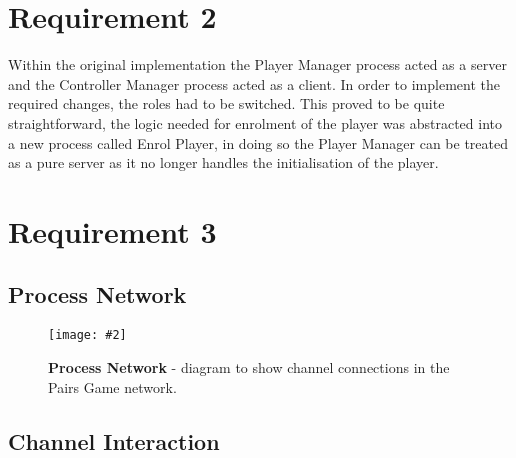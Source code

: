 \documentclass[10pt, a4paper]{article}
\title{\mytitle}
\author{\myauthor\hspace{1em}\\\contact\\Edinburgh Napier University\hspace{0.5em}-\hspace{0.5em}\mymodule}
\date{}
\newcommand{\figuremacro}[5]{
    \begin{figure}[#1]
        \centering
        \texttt{[image: \#2]}
        \caption[#3]{\textbf{#3}#4}
        \label{fig:#2}
    \end{figure}
}
\begin{document}
	\maketitle	
	
	
	\section{Requirement 2}
	

	
	Within the original implementation the Player Manager process acted as a server and the Controller Manager process acted as a client. In order to implement the required changes, the roles had to be switched. This proved to be quite straightforward, the logic needed for enrolment of the player was abstracted into a new process called Enrol Player, in doing so the Player Manager can be treated as a pure server as it no longer handles the initialisation of the player. 
	
	
	
	
	
	
	
	
	
	\section{Requirement 3}
	
	\subsection{Process Network}
	
	\figuremacro{H}{processNetwork}{Process Network}{ - diagram to show channel connections in the Pairs Game network.}{1.0}
	
	\subsection{Channel Interaction}
	
\end{document}
